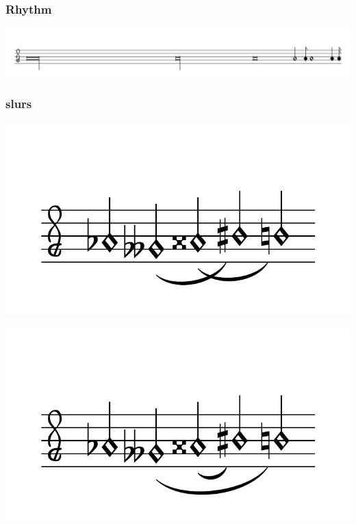 \documentclass{article}
\begin{document}
    \subsubsection{Rhythm}
        \includegraphics[scale=0.3]{figures_tests/pdf/smens/rhythm1.pdf}

    \subsubsection{slurs}
        \includegraphics[scale=0.6]{figures_tests/pdf/smens/slur1.pdf}


        \includegraphics[scale=0.6]{figures_tests/pdf/smens/slur2.pdf}


\end{document}
